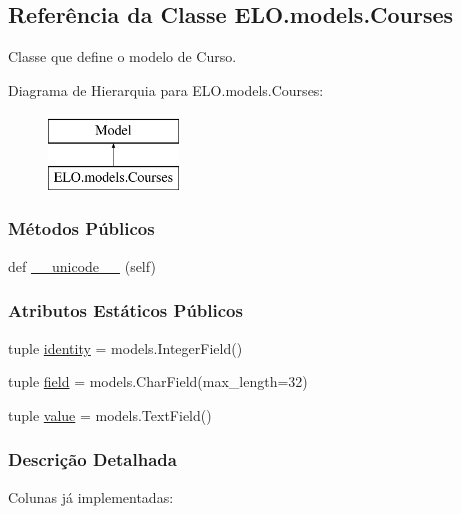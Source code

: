 \hypertarget{classELO_1_1models_1_1Courses}{}\subsection{Referência da Classe E\+L\+O.\+models.\+Courses}
\label{classELO_1_1models_1_1Courses}


Classe que define o modelo de Curso.  


Diagrama de Hierarquia para E\+L\+O.\+models.\+Courses\+:\begin{figure}[H]
\begin{center}
\leavevmode
\includegraphics[height=2.000000cm]{dd/dd9/classELO_1_1models_1_1Courses}
\end{center}
\end{figure}
\subsubsection*{Métodos Públicos}
\begin{DoxyCompactItemize}
\item 
def \hyperlink{classELO_1_1models_1_1Courses_a8676cba71b99ab2ba60726b9b5e33825}{\+\_\+\+\_\+unicode\+\_\+\+\_\+} (self)
\end{DoxyCompactItemize}
\subsubsection*{Atributos Estáticos Públicos}
\begin{DoxyCompactItemize}
\item 
tuple \hyperlink{classELO_1_1models_1_1Courses_a83d1bd0bc45319f3b88446f87f42a03e}{identity} = models.\+Integer\+Field()
\item 
tuple \hyperlink{classELO_1_1models_1_1Courses_a0ecbb317d4d82d5630b7a16a1df1711d}{field} = models.\+Char\+Field(max\+\_\+length=32)
\item 
tuple \hyperlink{classELO_1_1models_1_1Courses_a2b3c228ef67c767570b3555b3b7f1de2}{value} = models.\+Text\+Field()
\end{DoxyCompactItemize}


\subsubsection{Descrição Detalhada}
Colunas já implementadas\+:

